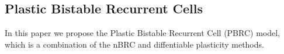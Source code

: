 \subsection*{Plastic Bistable Recurrent Cells}

In this paper we propose the Plastic Bistable Recurrent Cell (PBRC) model, which is a combination of the nBRC and diffentiable plasticity methods.